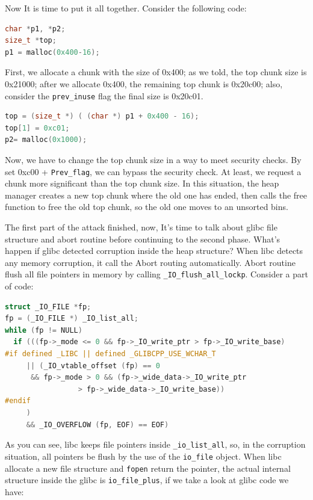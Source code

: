 \documentclass{masterthesis}
\newcommand*\libc{glibc}
\newcommand*\ub{unsorted bins}
\begin{document}
Now It is time to put it all together. Consider the following code:

\begin{lstlisting}[language=c,frame=tlrb]
char *p1, *p2;
size_t *top;
p1 = malloc(0x400-16);
 \end{lstlisting}

First, we allocate a chunk with the size of 0x400; as we told, the top chunk size is 0x21000; after we allocate 0x400, the remaining top chunk is 0x20c00; also, consider the \lstinline{prev_inuse} flag the final size is 0x20c01.

\begin{lstlisting}[language=c,frame=tlrb]
top = (size_t *) ( (char *) p1 + 0x400 - 16);
top[1] = 0xc01;
p2= malloc(0x1000);
\end{lstlisting}

Now, we have to change the top chunk size in a way to meet security checks. By set 0xc00 + \lstinline{Prev_flag}, we can bypass the security check. At least, we request a chunk more significant than the top chunk size. In this situation, the heap manager creates a new top chunk where the old one has ended, then calls the free function to free the old top chunk, so the old one moves to an \ub{}.

The first part of the attack finished, now, It's time to talk about \libc{} file structure and abort routine before continuing to the second phase. What's happen if \libc{} detected corruption inside the heap structure? When libc detects any memory corruption, it call the Abort routing automatically. Abort routine flush all file pointers in memory by calling \lstinline{_IO_flush_all_lockp}. Consider a part of code:

\begin{lstlisting}[language=c,frame=tlrb]
struct _IO_FILE *fp;
fp = (_IO_FILE *) _IO_list_all;
while (fp != NULL)
  if (((fp->_mode <= 0 && fp->_IO_write_ptr > fp->_IO_write_base)
#if defined _LIBC || defined _GLIBCPP_USE_WCHAR_T
	 || (_IO_vtable_offset (fp) == 0
	  && fp->_mode > 0 && (fp->_wide_data->_IO_write_ptr
				 > fp->_wide_data->_IO_write_base))
#endif
	 )
	 && _IO_OVERFLOW (fp, EOF) == EOF)
\end{lstlisting}

As you can see, libc keeps file pointers inside \lstinline{_io_list_all}, so, in the corruption situation, all pointers be flush by the use of the \lstinline{io_file} object. When libc allocate a new file structure and \lstinline{fopen} return the pointer, the actual internal structure inside the \libc{} is \lstinline{io_file_plus}, if we take a look at \libc{} code we have:
\end{document}

